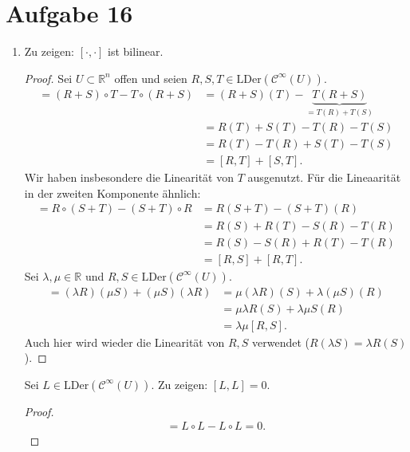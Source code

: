 \documentclass[a4paper]{article}
\theoremstyle{plain}
\begin{document}
\section*{Aufgabe 16}
\begin{enumerate}[label=(\roman*)]
	\item Zu zeigen: $[\cdot , \cdot]$ ist bilinear. 
	\begin{proof}
	Sei $U \subset \mathbb R^n$ offen und seien $R,S,T \in \mathrm{LDer}(\mathcal C^{\infty}(U))$.
	\begin{align*}
		[R+S, T] = (R+S) \circ T - T \circ (R+S) &= (R + S)(T) - \underbrace{T(R+S)}_{=T(R) + T(S)} \\
		&= R(T) + S(T) - T(R) - T(S)  \\
		&= R(T) - T(R) + S(T) - T(S) \\
		&= [R,T] + [S,T].
	\end{align*}
	Wir haben insbesondere die Linearität von $T$ ausgenutzt. Für die Lineaarität in der zweiten Komponente ähnlich:
	\begin{align*}
		[R, S+T] = R \circ (S+T) - (S+T) \circ R &= R(S+T) - (S+T)(R) \\
		&= R(S) + R(T) - S(R) - T(R)  \\
		&= R(S) - S(R) + R(T) - T(R) \\
		&= [R,S] + [R,T].
	\end{align*}
	Sei $\lambda, \mu \in \mathbb R$ und $R,S \in  \mathrm{LDer}(\mathcal C^{\infty}(U))$.
	\begin{align*}
		[\lambda R,\mu S] = (\lambda R)(\mu S) + (\mu S)(\lambda R) &= \mu (\lambda R)(S) + \lambda (\mu S)(R)\\
		 &= \mu \lambda R(S) + \lambda \mu S(R) \\
		 &= \lambda \mu [R,S].
 	\end{align*}
 	Auch hier wird wieder die Linearität von $R,S$ verwendet ($R(\lambda S) = \lambda R(S)$).
 	\end{proof}
 	Sei $L \in \mathrm{LDer}(\mathcal C^{\infty}(U))$. Zu zeigen: $[L,L] = 0$.
	\begin{proof}
		\begin{align*}
			[L,L] = L \circ L - L \circ L = 0.
		\end{align*}
	\end{proof}


\end{enumerate}
\end{document}
